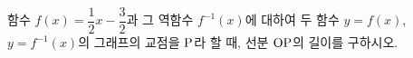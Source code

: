 함수 $f(x)=\dfrac{1}{2}x-\dfrac{3}{2}$과 그 역함수 $f^{-1}(x)$에 대하여 두 함수 $y=f(x)$, $y=f^{-1}(x)$의 그래프의 교점을 $\mathrm{P}$라 할 때, 선분 $\mathrm{OP}$의 길이를 구하시오. 
